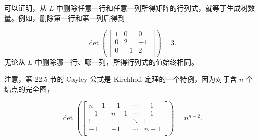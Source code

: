 可以证明，从 $L$ 中删除任意一行和任意一列所得矩阵的行列式，就等于生成树数量。例如，删除第一行和第一列后得到

\[ \det(
\begin{bmatrix}
  1 & 0 & 0 \\
  0 & 2 & -1 \\
  0 & -1 & 2 \\
 \end{bmatrix}
) =3.\]
无论从 $L$ 中删除哪一行、哪一列，所得行列式的值始终相同。

注意，第 22.5 节的 Cayley 公式是 Kirchhoff 定理的一个特例，因为对于含 $n$ 个结点的完全图，

\[ \det(
\begin{bmatrix}
  n-1 & -1 & \cdots & -1 \\
  -1 & n-1 & \cdots & -1 \\
  \vdots & \vdots & \ddots & \vdots \\
  -1 & -1 & \cdots & n-1 \\
 \end{bmatrix}
) =n^{n-2}.\]
